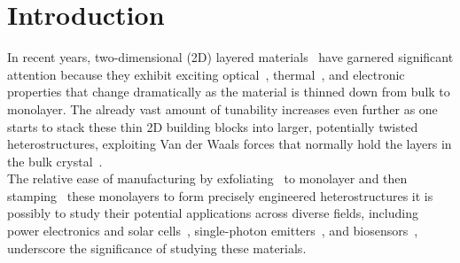 \chapter{Introduction}
%
In recent years, two-dimensional (2D) layered materials~\cite{2dmat, LI2016322, https://doi.org/10.1002/smll.202107059} have garnered significant attention because they exhibit exciting optical~\cite{optic1, yuHighlyEfficientGatetunable2013, dengBlackPhosphorusMonolayer2014, chengElectroluminescencePhotocurrentGeneration2014}, thermal~\cite{popThermalPropertiesGraphene2012, chenThermoelectricTransportGraphene2015}, and electronic~\cite{britnellFieldEffectTunnelingTransistor2012, georgiouVerticalFieldeffectTransistor2013, yuVerticallyStackedMultiheterostructures2013,moriyaLargeCurrentModulation2014, sarkarSubthermionicTunnelFieldeffect2015} properties that change dramatically as the material is thinned down from bulk to monolayer.
%
The already vast amount of tunability increases even further as one starts to stack these thin 2D building blocks into larger, potentially twisted heterostructures, exploiting Van der Waals forces that normally hold the layers in the bulk crystal~\cite{ScopusDocumentDetails, buscemaPhotocurrentGenerationTwodimensional2015, geimVanWaalsHeterostructures2013}.\\

The relative ease of manufacturing by exfoliating~\cite{bhushan2012encyclopedia,novoselovElectricFieldAtomically2004,kimLargescalePatternGrowth2009,deanBoronNitrideSubstrates2010a } to monolayer and then stamping~\cite{frisendaRecentProgressAssembly2018,castellanos-gomezDeterministicTransferTwodimensional2014} these monolayers to form precisely engineered heterostructures it is possibly to study their potential applications across diverse fields, including power electronics and solar cells~\cite{gongTwoStepGrowthTwoDimensional2015,liEpitaxialGrowthMonolayer2015,duanLateralEpitaxialGrowth2014,gongVerticalInplaneHeterostructures2014,hongUltrafastChargeTransfer2014}, single-photon emitters~\cite{koperskiSinglePhotonEmitters2015, rosenbergerQuantumCalligraphyWriting2019, pengCreationSinglePhotonEmitters2020}, and biosensors~\cite{loanGrapheneMoS2Heterostructures2014}, underscore the significance of studying these materials.\\

